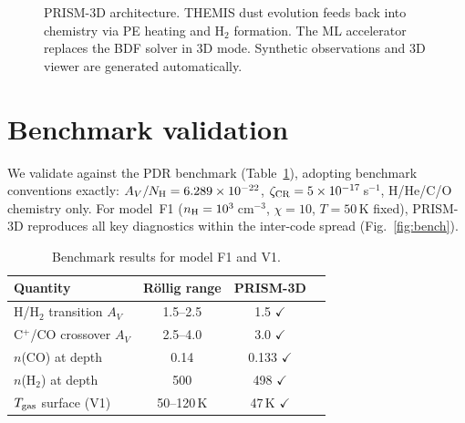 \documentclass[twocolumn,letterpaper]{article}
\newcommand{\zetacr}{\zeta_{\rm CR}}
\newcommand{\nH}{n_{\rm H}}
\newcommand{\Tgas}{T_{\rm gas}}
\newcommand{\Av}{A_V}
\newcommand{\HH}{\mathrm{H_2}}
\begin{document}
\begin{figure}
\centering
{}
\caption{PRISM-3D architecture. THEMIS dust evolution feeds back into chemistry
  via PE heating and $\HH$ formation. The ML accelerator replaces the BDF
  solver in 3D mode. Synthetic observations and 3D viewer are generated automatically.}
\label{fig:arch}
\end{figure}


\section{Benchmark validation}
\label{sec:benchmark}

We validate against the \citet{Roellig2007} PDR benchmark (Table~\ref{tab:bench}),
adopting benchmark conventions exactly: $\Av/N_{\rm H} = 6.289 \times 10^{-22}$,
$\zetacr = 5 \times 10^{-17}$\,s$^{-1}$, H/He/C/O chemistry only.
For model~F1 ($\nH = 10^3$\,cm$^{-3}$, $\chi = 10$, $T = 50$\,K fixed),
PRISM-3D reproduces all key diagnostics within the inter-code spread
(Fig.~\ref{fig:bench}).

\begin{table}
\centering
\caption{Benchmark results for model F1 and V1.}
\label{tab:bench}
\begin{tabular}{lccc}
\toprule
Quantity & R\"ollig range & PRISM-3D \\
\midrule
H/H$_2$ transition $\Av$ & 1.5--2.5 & 1.5 $\checkmark$ \\
C$^+$/CO crossover $\Av$ & 2.5--4.0 & 3.0 $\checkmark$ \\
$n$(CO) at depth & 0.14 & 0.133 $\checkmark$ \\
$n$(H$_2$) at depth & 500 & 498 $\checkmark$ \\
$\Tgas$ surface (V1) & 50--120\,K & 47\,K $\checkmark$ \\
\bottomrule
\end{tabular}
\end{table}
\end{document}
